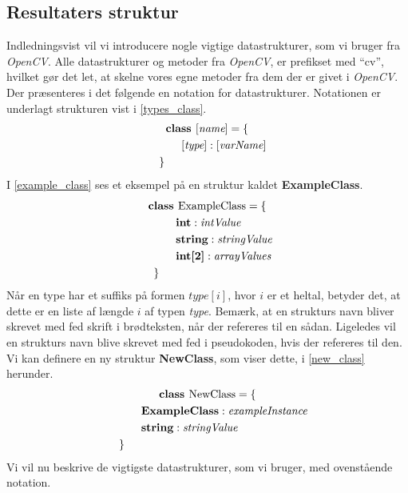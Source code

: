 {\subsection{Resultaters struktur\label{resultat_struktur}}
Indledningsvist vil vi introducere nogle vigtige datastrukturer, som vi
bruger fra \emph{OpenCV}. Alle datastrukturer og metoder fra
\emph{OpenCV}, er prefikset med ``cv'', hvilket gør det let, at skelne
vores egne metoder fra dem der er givet i \emph{OpenCV}.  Der
præsenteres i det følgende en notation for datastrukturer.  Notationen
er underlagt strukturen vist i \eqref{types_class}.
\begin{multline}
    \textbf{class~} [\textit{name}] = \{ \\
    \shoveleft{\qquad[\textit{type}] : [\textit{varName}]} \\
    \shoveleft{\}}\shoveright{}
    \label{types_class}
\end{multline}
I \eqref{example_class} ses et eksempel på en struktur kaldet
\textbf{ExampleClass}.
\begin{multline}
    \textbf{class~} \textrm{ExampleClass} = \{ \\
    \shoveleft{\qquad\textbf{int} : \textit{intValue}} \\
    \shoveleft{\qquad\textbf{string} : \textit{stringValue}} \\
    \shoveleft{\qquad\textbf{int[2]} : \textit{arrayValues}} \\
    \shoveleft{\}}\shoveright{}
    \label{example_class}
\end{multline}
Når en type har et suffiks på formen $\textit{type}[i]$, hvor $i$ er et
heltal, betyder det, at dette er en liste af længde $i$ af typen
\textit{type}.  Bemærk, at en strukturs navn bliver skrevet med fed
skrift i brødteksten, når der refereres til en sådan. Ligeledes vil en
strukturs navn blive skrevet med fed i pseudokoden, hvis der refereres
til den. Vi kan definere en ny struktur \textbf{NewClass}, som viser
dette, i \eqref{new_class} herunder.
\begin{multline}
    \textbf{class~} \textrm{NewClass} = \{ \\
    \shoveleft{\qquad\textbf{ExampleClass} : \textit{exampleInstance}} \\
    \shoveleft{\qquad\textbf{string} : \textit{stringValue}} \\
    \shoveleft{\}}\shoveright{}
    \label{new_class}
\end{multline}
Vi vil nu beskrive de vigtigste datastrukturer, som vi bruger, med
ovenstående notation.

}
